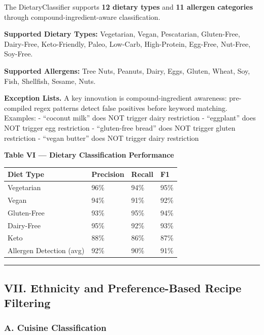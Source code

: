 \documentclass[
  10pt,
]{article}
\begin{document}
The DietaryClassifier supports \textbf{12 dietary types} and \textbf{11
allergen categories} through compound-ingredient-aware classification.

\textbf{Supported Dietary Types:} Vegetarian, Vegan, Pescatarian,
Gluten-Free, Dairy-Free, Keto-Friendly, Paleo, Low-Carb, High-Protein,
Egg-Free, Nut-Free, Soy-Free.

\textbf{Supported Allergens:} Tree Nuts, Peanuts, Dairy, Eggs, Gluten,
Wheat, Soy, Fish, Shellfish, Sesame, Nuts.

\textbf{Exception Lists.} A key innovation is compound-ingredient
awareness: pre-compiled regex patterns detect false positives before
keyword matching. Examples: - ``coconut milk'' does NOT trigger dairy
restriction - ``eggplant'' does NOT trigger egg restriction -
``gluten-free bread'' does NOT trigger gluten restriction - ``vegan
butter'' does NOT trigger dairy restriction

\textbf{Table VI --- Dietary Classification Performance}

\begin{longtable}[]{@{}llll@{}}
\toprule\noalign{}
Diet Type & Precision & Recall & F1 \\
\midrule\noalign{}
\endhead
\bottomrule\noalign{}
\endlastfoot
Vegetarian & 96\% & 94\% & 95\% \\
Vegan & 94\% & 91\% & 92\% \\
Gluten-Free & 93\% & 95\% & 94\% \\
Dairy-Free & 95\% & 92\% & 93\% \\
Keto & 88\% & 86\% & 87\% \\
Allergen Detection (avg) & 92\% & 90\% & 91\% \\
\end{longtable}

\begin{center}\rule{0.5\linewidth}{0.5pt}\end{center}

\subsection{VII. Ethnicity and Preference-Based Recipe
Filtering}\label{vii.-ethnicity-and-preference-based-recipe-filtering}

\subsubsection{A. Cuisine
Classification}\label{a.-cuisine-classification}
\end{document}
